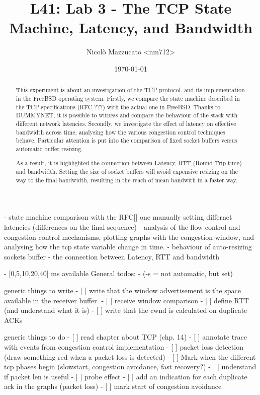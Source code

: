 \documentclass[a4paper,10pt]{article}
\begin{document}
\title{L41: Lab 3 - The TCP State Machine, Latency, and Bandwidth}
\author{Nicolò Mazzucato \textless{}nm712\textgreater{}}
\date{\today}

\maketitle

\thispagestyle{empty}

\begin{abstract}           
   This experiment is about an investigation of the TCP protocol, and its
   implementation in the FreeBSD operating system. Firstly, we compare the state machine described
   in the TCP specifications (RFC ???) with the actual one in FreeBSD. Thanks
   to DUMMYNET, it is possible to witness and compare the behaviour of the
   stack with different network latencies. Secondly, we investigate the effect
   of latency on effective bandwidth across time, analysing how the various
   congestion control techniques behave. Particular attention is put into the
   comparison of fixed socket buffers versus automatic buffer resizing.

   As a result, it is highlighted the connection between Latency, RTT (Round-Trip time) and bandwidth. 
   Setting the size of socket buffers will avoid expensive resizing on the way to the final bandwidth, resulting in the reach of mean bandwith in a faster way.


 
\end{abstract}

\iffalse
- state machine comparison with the RFC[] one manually setting differnet latencies (differences on the final sequence)
   - analysis of the flow-control and congestion control mechanisms, plotting graphs with the congestion window, and analysing how the tcp state variable change in time.
   - behaviour of auto-resizing sockets buffer
   - the connection between Latency, RTT and bandwidth

- [0,5,10,20,40] ms available
General todos:
- (-s = not automatic, but set)

generic things to write
- [ ] write that the window advertisement is the space available in the receiver buffer.
- [ ] receive window comparison
- [ ] define RTT (and understand what it is)
- [ ] write that the cwnd is calculated on duplicate ACKs

generic things to do 
- [ ] read chapter about TCP (chp. 14)
- [ ] annotate trace with events from congestion control implementation
- [ ] packet loss detection (draw something red when a packet loss is detected)
- [ ] Mark when  the different tcp phases begin (slowstart, congestion avoidance, fast recovery?)
- [ ] understand if packet len is useful
- [ ] probe effect
- [ ] add an indication for each duplicate ack in the graphs (packet loss)
- [ ] mark start of congestion avoidance
\end{document}

